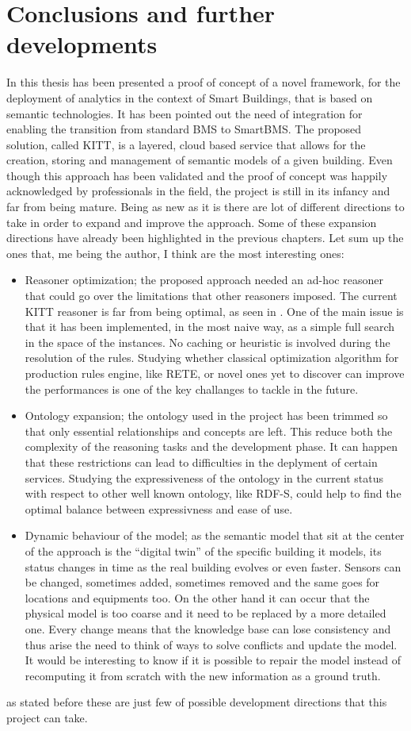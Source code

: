 \chapter{Conclusions and further developments}
In this thesis has been presented a proof of concept of a novel framework, for the deployment of analytics in the context of Smart Buildings, that is based on semantic technologies. It has been pointed out the need of integration for enabling the transition from standard BMS to SmartBMS. The proposed solution, called KITT, is a layered, cloud based service that allows for the creation, storing and management of semantic models of a given building. %
Even though this approach has been validated and the proof of concept was happily acknowledged by professionals in the field, the project is still in its infancy and far from being mature. Being as new as it is there are lot of different directions to take in order to expand and improve the approach. Some of these expansion directions have already been highlighted in the previous chapters. Let sum up the ones that, me being the author, I think are the most interesting ones:
\begin{itemize}
  \item Reasoner optimization; the proposed approach needed an ad-hoc reasoner that could go over the limitations that other reasoners imposed. The current KITT reasoner is far from being optimal, as seen in . One of the main issue is that it has been implemented, in the most naive way, as a simple full search in the space of the instances. No caching or heuristic is involved during the resolution of the rules. Studying whether classical optimization algorithm for production rules engine, like RETE, or novel ones yet to discover can improve the performances is one of the key challanges to tackle in the future.
  \item Ontology expansion; the ontology used in the project has been trimmed so that only essential relationships and concepts are left. This reduce both the complexity of the reasoning tasks and the development phase. It can happen that these restrictions can lead to difficulties in the deplyment of certain services. Studying the expressiveness of the ontology in the current status with respect to other well known ontology, like RDF-S, could help to find the optimal balance between expressivness and ease of use.
  \item Dynamic behaviour of the model; as the semantic model that sit at the center of the approach is the ``digital twin'' of the specific building it models, its status changes in time as the real building evolves or even faster. Sensors can be changed, sometimes added, sometimes removed and the same goes for locations and equipments too. On the other hand it can occur that the physical model is too coarse and it need to be replaced by a more detailed one. Every change means that the knowledge base can lose consistency and thus arise the need to think of ways to solve conflicts and update the model. It would be interesting to know if it is possible to repair the model instead of recomputing it from scratch with the new information as a ground truth.
\end{itemize}
as stated before these are just few of possible development directions that this project can take.
